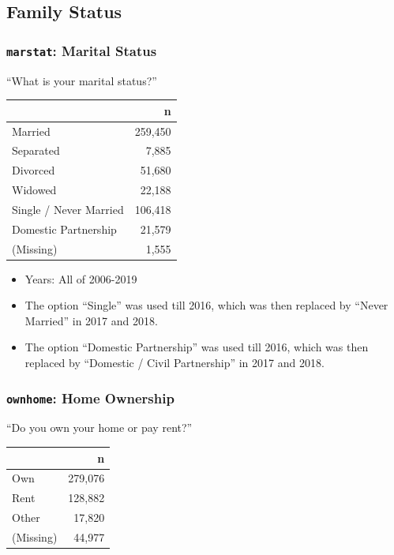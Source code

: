 \documentclass[10pt,article,oneside]{memoir}
\theoremstyle{definition}
\begin{document}
\hypertarget{family-status}{%
\subsection{Family Status}\label{family-status}}

\hypertarget{marstat-marital-status}{%
\subsubsection{\texorpdfstring{\texttt{marstat}: Marital
Status}{marstat: Marital Status}}\label{marstat-marital-status}}

``What is your marital status?''

\begin{table}[H]
\centering
\begin{tabular}{lr}
\toprule
 & n\\
\midrule
Married & 259,450\\
Separated & 7,885\\
Divorced & 51,680\\
Widowed & 22,188\\
Single / Never Married & 106,418\\
Domestic Partnership & 21,579\\
(Missing) & 1,555\\
\bottomrule
\end{tabular}
\end{table}

\begin{itemize}
\tightlist
\item
  Years: All of 2006-2019
\item
  The option ``Single'' was used till 2016, which was then replaced by
  ``Never Married'' in 2017 and 2018.
\item
  The option ``Domestic Partnership'' was used till 2016, which was then
  replaced by ``Domestic / Civil Partnership'' in 2017 and 2018.
\end{itemize}

\hypertarget{ownhome-home-ownership}{%
\subsubsection{\texorpdfstring{\texttt{ownhome}: Home
Ownership}{ownhome: Home Ownership}}\label{ownhome-home-ownership}}

``Do you own your home or pay rent?''

\begin{table}[H]
\centering
\begin{tabular}{lr}
\toprule
 & n\\
\midrule
Own & 279,076\\
Rent & 128,882\\
Other & 17,820\\
(Missing) & 44,977\\
\bottomrule
\end{tabular}
\end{table}
\end{document}
